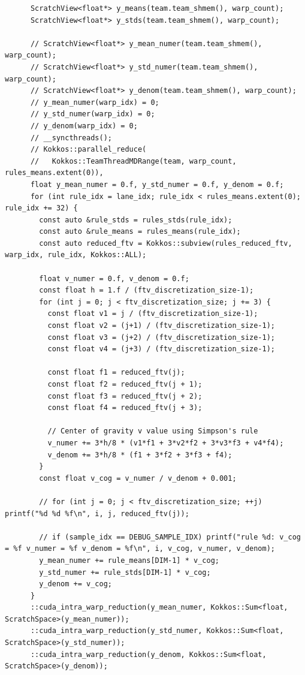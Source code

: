 \begin{verbatim}
      ScratchView<float*> y_means(team.team_shmem(), warp_count);
      ScratchView<float*> y_stds(team.team_shmem(), warp_count);

      // ScratchView<float*> y_mean_numer(team.team_shmem(), warp_count);
      // ScratchView<float*> y_std_numer(team.team_shmem(), warp_count);
      // ScratchView<float*> y_denom(team.team_shmem(), warp_count);
      // y_mean_numer(warp_idx) = 0;
      // y_std_numer(warp_idx) = 0;
      // y_denom(warp_idx) = 0;
      // __syncthreads();
      // Kokkos::parallel_reduce(
      //   Kokkos::TeamThreadMDRange(team, warp_count, rules_means.extent(0)),
      float y_mean_numer = 0.f, y_std_numer = 0.f, y_denom = 0.f;
      for (int rule_idx = lane_idx; rule_idx < rules_means.extent(0); rule_idx += 32) {
        const auto &rule_stds = rules_stds(rule_idx);
        const auto &rule_means = rules_means(rule_idx);
        const auto reduced_ftv = Kokkos::subview(rules_reduced_ftv, warp_idx, rule_idx, Kokkos::ALL);

        float v_numer = 0.f, v_denom = 0.f;
        const float h = 1.f / (ftv_discretization_size-1);
        for (int j = 0; j < ftv_discretization_size; j += 3) {
          const float v1 = j / (ftv_discretization_size-1);
          const float v2 = (j+1) / (ftv_discretization_size-1);
          const float v3 = (j+2) / (ftv_discretization_size-1);
          const float v4 = (j+3) / (ftv_discretization_size-1);

          const float f1 = reduced_ftv(j);
          const float f2 = reduced_ftv(j + 1);
          const float f3 = reduced_ftv(j + 2);
          const float f4 = reduced_ftv(j + 3);

          // Center of gravity v value using Simpson's rule
          v_numer += 3*h/8 * (v1*f1 + 3*v2*f2 + 3*v3*f3 + v4*f4);
          v_denom += 3*h/8 * (f1 + 3*f2 + 3*f3 + f4);
        }
        const float v_cog = v_numer / v_denom + 0.001;

        // for (int j = 0; j < ftv_discretization_size; ++j) printf("%d %d %f\n", i, j, reduced_ftv(j));

        // if (sample_idx == DEBUG_SAMPLE_IDX) printf("rule %d: v_cog = %f v_numer = %f v_denom = %f\n", i, v_cog, v_numer, v_denom);
        y_mean_numer += rule_means[DIM-1] * v_cog;
        y_std_numer += rule_stds[DIM-1] * v_cog;
        y_denom += v_cog;
      }
      ::cuda_intra_warp_reduction(y_mean_numer, Kokkos::Sum<float, ScratchSpace>(y_mean_numer));
      ::cuda_intra_warp_reduction(y_std_numer, Kokkos::Sum<float, ScratchSpace>(y_std_numer));
      ::cuda_intra_warp_reduction(y_denom, Kokkos::Sum<float, ScratchSpace>(y_denom));


\end{verbatim}
